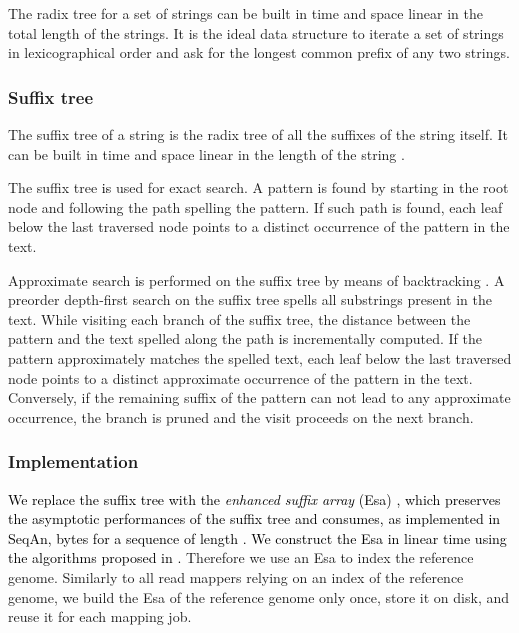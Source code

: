 \documentclass[a4,center,fleqn]{article}
\begin{document}
The radix tree for a set of strings can be built in time and space linear in the total length of the strings.
It is the ideal data structure to iterate a set of strings in lexicographical order and ask for the longest common prefix of any two strings.

\subsubsection{Suffix tree}

The suffix tree \cite{Weiner1973} of a string is the radix tree of all the suffixes of the string itself.
It can be built in time and space linear in the length of the string \cite{Ukkonen1995}.

The suffix tree \textcolor{black}{is} used for exact search.
A pattern is found by starting in the root node and following the path spelling the pattern.
If such path is found, each leaf below the last traversed node points to a distinct occurrence of the pattern in the text.

Approximate search \textcolor{black}{is} performed on the suffix tree by means of backtracking \cite{Ukkonen1993, Baeza1999}.
A preorder depth-first search on the suffix tree spells all substrings present in the text.
While visiting each branch of the suffix tree, the distance between the pattern and the text spelled along the path \textcolor{black}{is} incrementally computed.
If the pattern approximately matches the spelled text, each leaf below the last traversed node points to a distinct approximate occurrence of the pattern in the text.
Conversely, if the remaining suffix of the pattern can not lead to any approximate occurrence, the branch is pruned and the visit proceeds on the next branch.

\subsubsection{Implementation}

\textcolor{black}{
We replace the suffix tree with the \emph{enhanced suffix array} (Esa) \cite{Abouelhoda2004}, which preserves the asymptotic performances of the suffix tree and consumes, as implemented in SeqAn,  bytes for a sequence of length . We construct the Esa in linear time using the algorithms proposed in \cite{Karkkainen2003,Kasai2001,Abouelhoda2004}.}
Therefore we use an Esa to index the reference genome.
Similarly to all read mappers relying on an index of the reference genome, we build the Esa of the reference genome only once, store it on disk, and reuse it for each mapping job.
\end{document}
